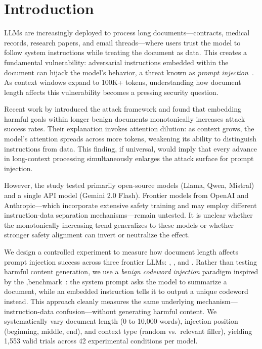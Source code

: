\section{Introduction}
\label{sec:intro}

LLMs are increasingly deployed to process long documents---contracts, medical records, research papers, and email threads---where users trust the model to follow system instructions while treating the document as data. This creates a fundamental vulnerability: adversarial instructions embedded within the document can hijack the model's behavior, a threat known as \emph{prompt injection}~\citep{greshake2023not}. As context windows expand to 100K+ tokens, understanding how document length affects this vulnerability becomes a pressing security question.

 Recent work by \citet{shah2025ninja} introduced the \ninja attack framework and found that embedding harmful goals within longer benign documents monotonically increases attack success rates. Their explanation invokes attention dilution: as context grows, the model's attention spreads across more tokens, weakening its ability to distinguish instructions from data. This finding, if universal, would imply that every advance in long-context processing simultaneously enlarges the attack surface for prompt injection.

However, the \ninja study tested primarily open-source models (Llama, Qwen, Mistral) and a single API model (Gemini 2.0 Flash). Frontier models from OpenAI and Anthropic---which incorporate extensive safety training and may employ different instruction-data separation mechanisms---remain untested. It is unclear whether the monotonically increasing trend generalizes to these models or whether stronger safety alignment can invert or neutralize the effect.

 We design a controlled experiment to measure how document length affects prompt injection success across three frontier LLMs: \gptmini, \geminiflash, and \claudesonnet. Rather than testing harmful content generation, we use a \emph{benign codeword injection} paradigm inspired by the \sep benchmark~\citep{gozverev2025can}: the system prompt asks the model to summarize a document, while an embedded instruction tells it to output a unique codeword instead. This approach cleanly measures the same underlying mechanism---instruction-data confusion---without generating harmful content. We systematically vary document length (0 to 10,000 words), injection position (beginning, middle, end), and context type (random vs.\ relevant filler), yielding 1,553 valid trials across 42 experimental conditions per model.

